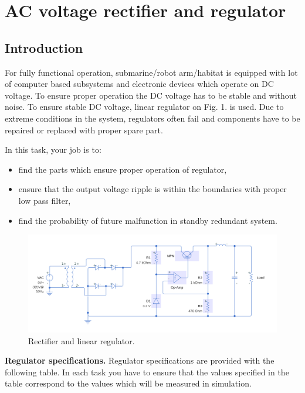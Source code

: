 \documentclass[a4paper]{article}
\begin{document}
\section{AC voltage rectifier and regulator}

\subsection{Introduction}

For fully functional operation, submarine/robot arm/habitat is equipped with 
lot of computer based subsystems and electronic devices which operate on DC 
voltage. To ensure proper operation the DC voltage has to be stable and without 
noise. To ensure stable DC voltage, linear regulator on Fig. 1. is used. Due to 
extreme conditions in the system, regulators often fail and components have to 
be repaired or replaced with proper spare part.

In this task, your job is to:
\begin{itemize}
\item find the parts which ensure proper operation of regulator, 
\item ensure that the output voltage ripple is within the boundaries with 
proper low pass filter,
\item find the probability of future malfunction in standby redundant system.
\end{itemize}

\begin{figure}[h!]
\centering
\includegraphics[width=\linewidth]{images/reg.png}

\caption{Rectifier and linear regulator.}
\end{figure}

\textbf{Regulator specifications.} Regulator specifications are provided with 
the following table. In each task you have to ensure that the values specified
in the table correspond to the values which will be measured in simulation. 
\end{document}
